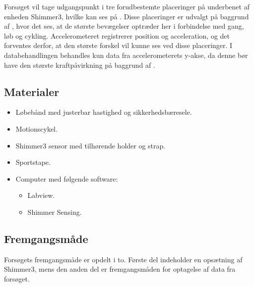 Forsøget vil tage udgangspunkt i tre forudbestemte placeringer på underbenet af enheden Shimmer3, hvilke kan ses på . Disse placeringer er udvalgt på baggrund af , hvor det ses, at de største bevægelser optræder her i forbindelse med gang, løb og cykling. Accelerometeret registrerer position og acceleration, og det forventes derfor, at den største forskel vil kunne ses ved disse placeringer. I databehandlingen behandles kun data fra accelerometerets y-akse, da denne bør have den største kraftpåvirkning på baggrund af .

\subsection{Materialer}
\begin{itemize}
	\item Løbebånd med justerbar hastighed og sikkerhedsbæresele.
	\item Motionscykel.
	\item Shimmer3 sensor med tilhørende holder og strap.
	\item Sportstape.
	\item Computer med følgende software:
	\begin{itemize}\vspace{-.15cm}
		\item Labview.
		\item Shimmer Sensing.
	\end{itemize}
\end{itemize}

\subsection{Fremgangsmåde}
Forsøgets fremgangsmåde er opdelt i to. Første del indeholder en opsætning af Shimmer3, mens den anden del er fremgangsmåden for optagelse af data fra forsøget.

